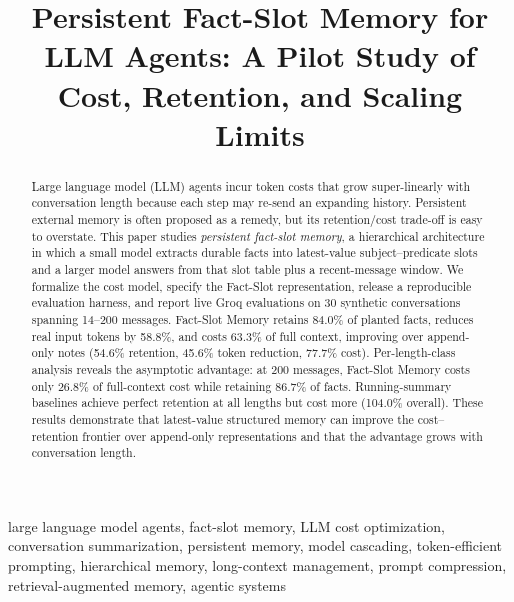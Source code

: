 \documentclass[conference]{IEEEtran}
\begin{document}
\title{Persistent Fact-Slot Memory for LLM Agents: A Pilot Study of Cost, Retention, and Scaling Limits}

\author{
\and
{}
}

\maketitle

\begin{abstract}
Large language model (LLM) agents incur token costs that grow super-linearly with conversation length because each step may re-send an expanding history. Persistent external memory is often proposed as a remedy, but its retention/cost trade-off is easy to overstate. This paper studies \emph{persistent fact-slot memory}, a hierarchical architecture in which a small model extracts durable facts into latest-value subject--predicate slots and a larger model answers from that slot table plus a recent-message window. We formalize the cost model, specify the Fact-Slot representation, release a reproducible evaluation harness, and report live Groq evaluations on 30 synthetic conversations spanning 14--200 messages. Fact-Slot Memory retains 84.0\% of planted facts, reduces real input tokens by 58.8\%, and costs 63.3\% of full context, improving over append-only notes (54.6\% retention, 45.6\% token reduction, 77.7\% cost). Per-length-class analysis reveals the asymptotic advantage: at 200 messages, Fact-Slot Memory costs only 26.8\% of full-context cost while retaining 86.7\% of facts. Running-summary baselines achieve perfect retention at all lengths but cost more (104.0\% overall). These results demonstrate that latest-value structured memory can improve the cost--retention frontier over append-only representations and that the advantage grows with conversation length.
\end{abstract}

\begin{IEEEkeywords}
large language model agents, fact-slot memory, LLM cost optimization, conversation summarization, persistent memory, model cascading, token-efficient prompting, hierarchical memory, long-context management, prompt compression, retrieval-augmented memory, agentic systems
\end{IEEEkeywords}
\end{document}
